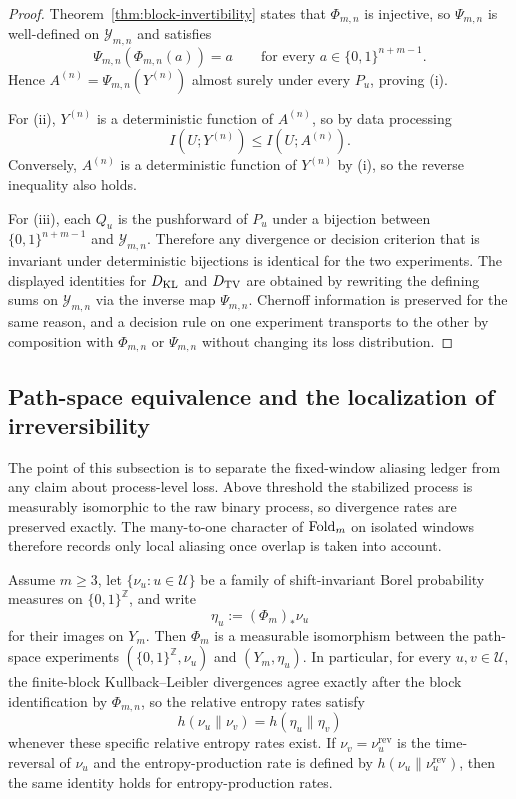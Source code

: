 \begin{proof}
Theorem~\ref{thm:block-invertibility} states that $\Phi_{m,n}$ is injective, so $\Psi_{m,n}$ is well-defined on $\mathcal Y_{m,n}$ and satisfies
\[
\Psi_{m,n}(\Phi_{m,n}(a))=a
\qquad\text{for every }a\in\{0,1\}^{n+m-1}.
\]
Hence $A^{(n)}=\Psi_{m,n}(Y^{(n)})$ almost surely under every $P_u$, proving (i).

For (ii), $Y^{(n)}$ is a deterministic function of $A^{(n)}$, so by data processing
\[
I(U;Y^{(n)})\le I(U;A^{(n)}).
\]
Conversely, $A^{(n)}$ is a deterministic function of $Y^{(n)}$ by (i), so the reverse inequality also holds.

For (iii), each $Q_u$ is the pushforward of $P_u$ under a bijection between $\{0,1\}^{n+m-1}$ and $\mathcal Y_{m,n}$. Therefore any divergence or decision criterion that is invariant under deterministic bijections is identical for the two experiments. The displayed identities for $D_{\mathrm{KL}}$ and $D_{\mathrm{TV}}$ are obtained by rewriting the defining sums on $\mathcal Y_{m,n}$ via the inverse map $\Psi_{m,n}$. Chernoff information is preserved for the same reason, and a decision rule on one experiment transports to the other by composition with $\Phi_{m,n}$ or $\Psi_{m,n}$ without changing its loss distribution.
\end{proof}

\subsection{Path-space equivalence and the localization of irreversibility}

The point of this subsection is to separate the fixed-window aliasing ledger from any claim about process-level loss. Above threshold the stabilized process is measurably isomorphic to the raw binary process, so divergence rates are preserved exactly. The many-to-one character of $\mathrm{Fold}_m$ on isolated windows therefore records only local aliasing once overlap is taken into account.

\begin{corollary}\label{cor:path-space-divergence}
Assume $m\ge 3$, let $\{\nu_u:u\in\mathcal U\}$ be a family of shift-invariant Borel probability measures on $\{0,1\}^{\mathbb Z}$, and write
\[
\eta_u:=(\Phi_m)_*\nu_u
\]
for their images on $Y_m$. Then $\Phi_m$ is a measurable isomorphism between the path-space experiments $(\{0,1\}^{\mathbb Z},\nu_u)$ and $(Y_m,\eta_u)$. In particular, for every $u,v\in\mathcal U$, the finite-block Kullback--Leibler divergences agree exactly after the block identification by $\Phi_{m,n}$, so the relative entropy rates satisfy
\[
h(\nu_u\|\nu_v)=h(\eta_u\|\eta_v)
\]
whenever these specific relative entropy rates exist. If $\nu_v=\nu_u^{\mathrm{rev}}$ is the time-reversal of $\nu_u$ and the entropy-production rate is defined by $h(\nu_u\|\nu_u^{\mathrm{rev}})$, then the same identity holds for entropy-production rates.
\end{corollary}

